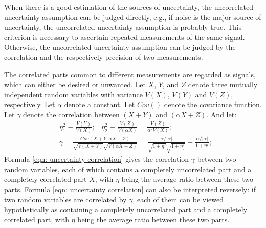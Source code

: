 \documentclass[twoside]{article}
\numberwithin{equation}{section}
\newcommand{\eqspace}{\;\;\;}
\begin{document}
When there is a good estimation of the sources of uncertainty, the uncorrelated uncertainty assumption can be judged directly, e.g., if noise \cite{Statistical_Methods}\cite{Precisions_Physical_Measurements} is the major source of uncertainty, the uncorrelated uncertainty assumption is probably true.  
This criterion is necessary to ascertain repeated measurements of the same signal.   
Otherwise, the uncorrelated uncertainty assumption can be judged by the correlation and the respectively precision of two measurements.  

The correlated parts common to different measurements are regarded as signals, which can either be desired or unwanted.
Let $X$, $Y$, and $Z$ denote three mutually independent random variables \cite{Probability_Statistics} with variance $V(X)$, $V(Y)$ and $V(Z)$, respectively.  
Let $\alpha$ denote a constant.  
Let $Cov()$ denote the covariance function.  
Let $\gamma$ denote the correlation between $(X + Y)$ and $(\alpha X + Z)$. And let:
\begin{align}
\label{eqn: uncertainty ratio}
& \eta _{1} ^{2} \equiv \frac{V(Y)}{V(X)}; \eqspace
 \eta _{2} ^{2} \equiv \frac{V(Z)}{V(\alpha X)} =\frac{V(Z)}{\alpha ^{2} V(X)};  \\
\label{eqn: uncertainty correlation}
& \gamma =\frac{Cov(X+Y,\alpha X+Z)}{\sqrt{V(X+Y)} \sqrt{V(\alpha X+Z)}}  =\frac{\alpha /|\alpha |}{\sqrt{1+\eta _{1} ^{2} } \sqrt{1+\eta _{2} ^{2}}} \equiv \frac{\alpha /|\alpha |}{1+\eta ^{2}};
\end{align}
Formula \eqref{eqn: uncertainty correlation} gives the correlation $\gamma$ between two random variables, each of which contains a completely uncorrelated part and a completely correlated part $X$, with $\eta$ being the average ratio between these two parts.  
Formula \eqref{eqn: uncertainty correlation} can also be interpreted reversely: if two random variables are correlated by $\gamma$, each of them can be viewed hypothetically as containing a completely uncorrelated part and a completely correlated part, with $\eta$ being the average ratio between these two parts.
\end{document}
